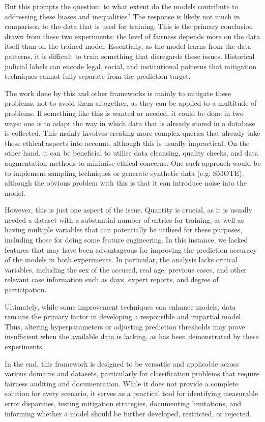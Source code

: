 \documentclass[fleqn,10pt]{wlscirep}
\begin{document}
But this prompts the question: to what extent do the models contribute to addressing these biases and inequalities? The response is likely not much in comparison to the data that is used for training. This is the primary conclusion drawn from these two experiments: the level of fairness depends more on the data itself than on the trained model. Essentially, as the model learns from the data patterns, it is difficult to train something that disregards these issues. Historical judicial labels can encode legal, social, and institutional patterns that mitigation techniques cannot fully separate from the prediction target.

The work done by this and other frameworks is mainly to mitigate these problems, not to avoid them altogether, as they can be applied to a multitude of problems. If something like this is wanted or needed, it could be done in two ways: one is to adapt the way in which data that is already stored in a database is collected. This mainly involves creating more complex queries that already take these ethical aspects into account, although this is usually impractical. On the other hand, it can be beneficial to utilise data cleansing, quality checks, and data augmentation methods to minimise ethical concerns. One such approach would be to implement sampling techniques or generate synthetic data (e.g. SMOTE), although the obvious problem with this is that it can introduce noise into the model.

However, this is just one aspect of the issue. Quantity is crucial, as it is usually needed a dataset with a substantial number of entries for training, as well as having multiple variables that can potentially be utilised for these purposes, including those for doing some feature engineering. In this instance, we lacked features that may have been advantageous for improving the prediction accuracy of the models in both experiments. In particular, the analysis lacks critical variables, including the sex of the accused, real age, previous cases, and other relevant case information such as days, expert reports, and degree of participation.

Ultimately, while some improvement techniques can enhance models, data remains the primary factor in developing a responsible and impartial model. Thus, altering hyperparameters or adjusting prediction thresholds may prove insufficient when the available data is lacking, as has been demonstrated by these experiments.

In the end, this framework is designed to be versatile and applicable across various domains and datasets, particularly for classification problems that require fairness auditing and documentation. While it does not provide a complete solution for every scenario, it serves as a practical tool for identifying measurable error disparities, testing mitigation strategies, documenting limitations, and informing whether a model should be further developed, restricted, or rejected.
\end{document}

